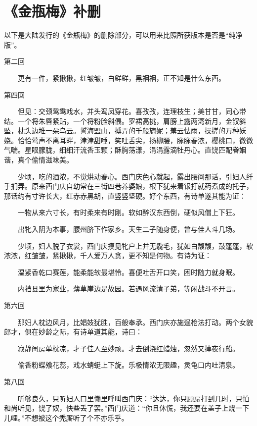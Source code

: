 %

\chapter*{《金瓶梅》补删}

以下是大陆发行的《金瓶梅》的删除部分，可以用来比照所获版本是否是``纯净版''。

第二回

　　更有一件，紧揪揪，红皱皱，白鲜鲜，黑裀裀，正不知是什么东西。


第四回

　　但见：交颈鸳鸯戏水，并头鸾凤穿花。喜孜孜，连理枝生；美甘甘，同心带结。一个将朱唇紧贴，一个将粉脸斜偎。罗裙高挑，肩膀上露两湾新月，金钗斜坠，枕头边堆一朵乌云。誓海盟山，搏弄的千般旖妮；羞云怯雨，操搓的万种妖娆。恰恰莺声不离耳畔，津津甜唾，笑吐舌尖，扬柳腰，脉脉春浓，樱桃口，微微气喘。星眼朦胧，细细汗流香玉颗；酥胸荡漾，涓涓露滴牡丹心。直饶匹配眷姻谐，真个偷情滋味美。


　　少顷，吃的酒浓，不觉烘动春心。西门庆色心就起，露出腰间那话，引妇人纤手扪弄。原来西门庆自幼常在三街四巷养婆娘，根下犹来着银打就药煮成的托子，那话约有寸许长大，红赤赤黑胡，直竖竖坚硬。好个东西，有诗单遂其能为证：

　　一物从来六寸长，有时柔来有时刚。软如醉汉东西倒，硬似风僧上下狂。

　　出牝入阴为本事，腰州脐下作家乡。天生二子随身便，曾与佳人斗几场。

　　少顷，妇人脱了衣裳，西门庆摸见牝户上并无毳毛，犹如白馥馥，鼓蓬蓬，软浓浓，红皱皱，紧揪揪，千人爱万人贪，更不知是何物。有诗为证：

　　温紧香乾口赛莲，能柔能软最堪怜。喜便吐舌开口笑，困时随力就身眠。

　　内裆县里为家业，薄草崖边是故园。若遇风流清子弟，等闲战斗不开言。


第六回

　　那妇人枕边风月，比娼妓犹胜，百般奉承。西门庆亦施逞枪法打动。两个女貌郎才，俱在妙龄之际，有诗单道其能，诗曰：

　　寂静闺房单枕凉，才子佳人至妙顽。才去倒浇红蜡烛，忽然又掉夜行船。

　　偷香粉蝶飧花蕊，戏水蜻蜓上下旋。乐极情浓无限趣，灵龟口内吐清泉。


第八回

　　听够良久，只听妇人口里懒里呼叫西门庆：“达达，你只顾扇打到几时，只怕和尚听见，饶了奴，快些丢了罢。”西门庆道：“你且休慌，我还要在盖子上烧一下儿哩。”不想被这个秃厮听了个不亦乐乎。


